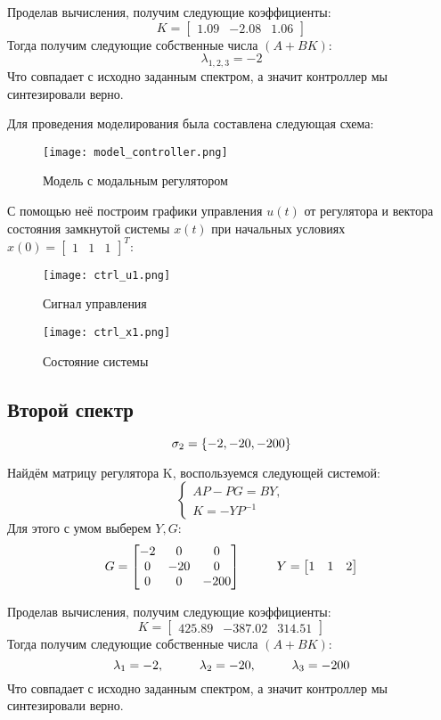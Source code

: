 Проделав вычисления, получим следующие коэффициенты:
$$
  K = \begin{bmatrix}
    1.09 & -2.08 & 1.06
  \end{bmatrix}
$$
Тогда получим следующие собственные числа $(A+BK)$:
$$
    \lambda_{1,2,3} = -2
$$
Что совпадает с исходно заданным спектром, а значит контроллер мы синтезировали верно.

Для проведения моделирования была составлена следующая схема:
\begin{figure}[ht]
  \centering
  \texttt{[image: model\_controller.png]}
  \caption{Модель с модальным регулятором}
\end{figure}

С помощью неё построим графики управления $u(t)$ от регулятора и вектора состояния замкнутой системы $x(t)$
при начальных условиях $x(0) = \begin{bmatrix} 1 & 1 & 1 \end{bmatrix}^T$:
\newpage
\begin{figure}[ht]
  \centering
  \texttt{[image: ctrl\_u1.png]}
  \caption{Сигнал управления}
\end{figure}
\begin{figure}[ht]
  \centering
  \texttt{[image: ctrl\_x1.png]}
  \caption{Состояние системы}
\end{figure}

\newpage
\subsection{Второй спектр}
$$
    \sigma_2 = \{-2, -20, -200\} \\
$$

Найдём матрицу регулятора K, воспользуемся следующей системой:
$$
\begin{cases}
  AP - PG = BY, \\
  K = -YP^{-1}
\end{cases}
$$ Для этого с умом выберем $Y,G$:
$$
G = \begin{bmatrix}
    -2  &  0  & 0 \\
     0  & -20  & 0 \\
     0  &  0  & -200 
\end{bmatrix} \hspace*{1cm} Y = \begin{bmatrix}
  1 & 1 & 2
\end{bmatrix}
$$

Проделав вычисления, получим следующие коэффициенты:
$$
  K = \begin{bmatrix}
    425.89 & -387.02 & 314.51
  \end{bmatrix}
$$
Тогда получим следующие собственные числа $(A+BK)$:
$$
    \lambda_1 = -2, \hspace*{1cm} \lambda_2 = -20, \hspace*{1cm} \lambda_3 = -200
$$
Что совпадает с исходно заданным спектром, а значит контроллер мы синтезировали верно.

